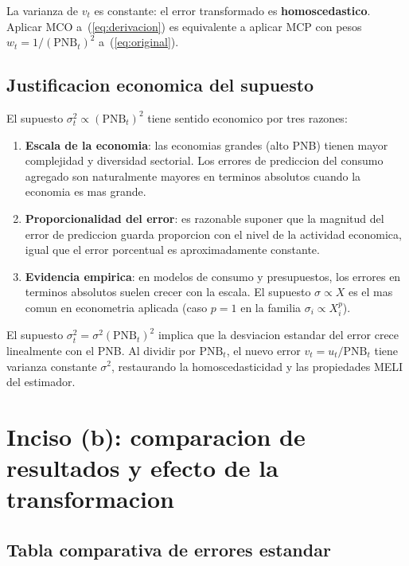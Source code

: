 \documentclass[12pt, letterpaper]{article}
\theoremstyle{remark}
\begin{document}
La varianza de $v_t$ es constante: el error transformado es \textbf{homoscedastico}.
Aplicar MCO a~(\ref{eq:derivacion}) es equivalente a aplicar MCP con pesos
$w_t = 1/(\text{PNB}_t)^2$ a~(\ref{eq:original}).

\subsection{Justificacion economica del supuesto}

El supuesto $\sigma_t^2 \propto (\text{PNB}_t)^2$ tiene sentido economico por
tres razones:

\begin{enumerate}[leftmargin=1.8em, itemsep=5pt]
  \item \textbf{Escala de la economia}: las economias grandes (alto PNB) tienen
    mayor complejidad y diversidad sectorial. Los errores de prediccion del
    consumo agregado son naturalmente mayores en terminos absolutos cuando la
    economia es mas grande.

  \item \textbf{Proporcionalidad del error}: es razonable suponer que la
    magnitud del error de prediccion guarda proporcion con el nivel de la
    actividad economica, igual que el error porcentual es aproximadamente
    constante.

  \item \textbf{Evidencia empirica}: en modelos de consumo y presupuestos,
    los errores en terminos absolutos suelen crecer con la escala.
    El supuesto $\sigma \propto X$ es el mas comun en econometria aplicada
    (caso $p = 1$ en la familia $\sigma_i \propto X_i^p$).
\end{enumerate}

\begin{clave}
  El supuesto $\sigma_t^2 = \sigma^2(\text{PNB}_t)^2$ implica que la desviacion
  estandar del error crece linealmente con el PNB. Al dividir por $\text{PNB}_t$,
  el nuevo error $v_t = u_t/\text{PNB}_t$ tiene varianza constante $\sigma^2$,
  restaurando la homoscedasticidad y las propiedades MELI del estimador.
\end{clave}

\section{Inciso (b): comparacion de resultados y efecto de la transformacion}

\subsection{Tabla comparativa de errores estandar}
\end{document}
